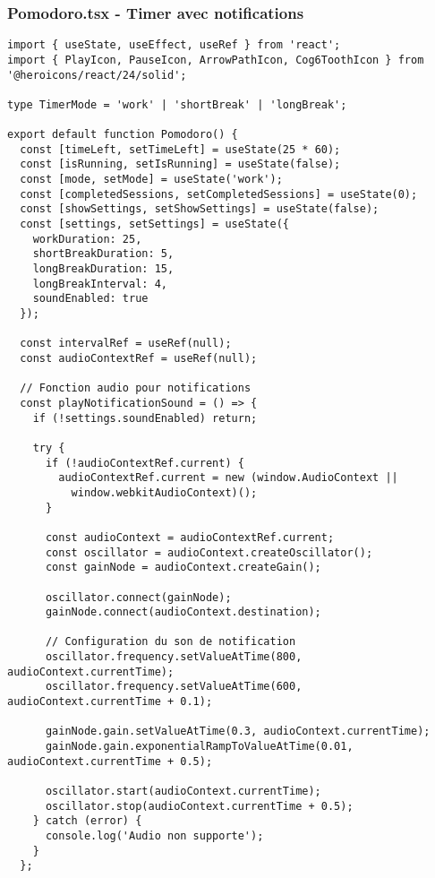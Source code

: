 \documentclass[12pt,a4paper]{article}
\begin{document}
\subsubsection{Pomodoro.tsx - Timer avec notifications}

\begin{lstlisting}[caption=Pomodoro.tsx - Timer Pomodoro complet (Robin)]
import { useState, useEffect, useRef } from 'react';
import { PlayIcon, PauseIcon, ArrowPathIcon, Cog6ToothIcon } from '@heroicons/react/24/solid';

type TimerMode = 'work' | 'shortBreak' | 'longBreak';

export default function Pomodoro() {
  const [timeLeft, setTimeLeft] = useState(25 * 60);
  const [isRunning, setIsRunning] = useState(false);
  const [mode, setMode] = useState('work');
  const [completedSessions, setCompletedSessions] = useState(0);
  const [showSettings, setShowSettings] = useState(false);
  const [settings, setSettings] = useState({
    workDuration: 25,
    shortBreakDuration: 5,
    longBreakDuration: 15,
    longBreakInterval: 4,
    soundEnabled: true
  });

  const intervalRef = useRef(null);
  const audioContextRef = useRef(null);

  // Fonction audio pour notifications
  const playNotificationSound = () => {
    if (!settings.soundEnabled) return;
    
    try {
      if (!audioContextRef.current) {
        audioContextRef.current = new (window.AudioContext || 
          window.webkitAudioContext)();
      }
      
      const audioContext = audioContextRef.current;
      const oscillator = audioContext.createOscillator();
      const gainNode = audioContext.createGain();
      
      oscillator.connect(gainNode);
      gainNode.connect(audioContext.destination);
      
      // Configuration du son de notification
      oscillator.frequency.setValueAtTime(800, audioContext.currentTime);
      oscillator.frequency.setValueAtTime(600, audioContext.currentTime + 0.1);
      
      gainNode.gain.setValueAtTime(0.3, audioContext.currentTime);
      gainNode.gain.exponentialRampToValueAtTime(0.01, audioContext.currentTime + 0.5);
      
      oscillator.start(audioContext.currentTime);
      oscillator.stop(audioContext.currentTime + 0.5);
    } catch (error) {
      console.log('Audio non supporte');
    }
  };


\end{lstlisting}
\end{document}
